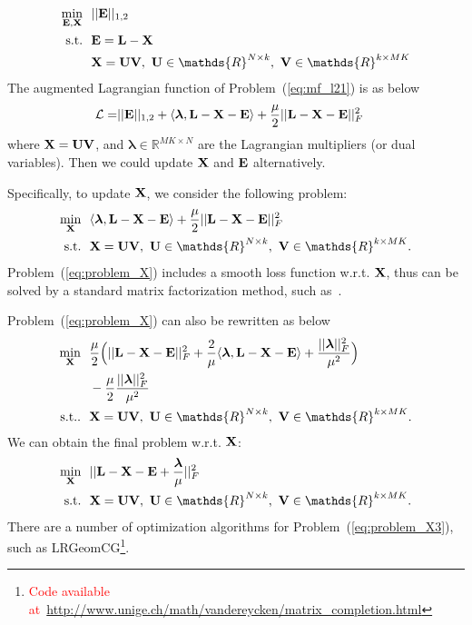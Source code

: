 \documentclass[letterpaper]{article}
\def\bE{{\bf E}}
\def\blambda{{\bm \lambda}}
\def\calL{{\mathcal{L}}}
\def\bL{{\bf L}}
\def\bU{{\bf U}}
\def\bV{{\bf V}}
\def\dsR{\mathds{R}}
\def\bX{{\bf X}}
\def\bX{{\bf X}}
\def\st{{\text{s.t.}}}
\def\yanred{\textcolor{red}}
\begin{document}
\begin{align}\label{eq:mf_l21_constrained}
  \min_{\bE, \bX} ~&~ || \bE ||_{1,2}   \nonumber \\
  \st             ~&~ \bE = \bL - \bX   \nonumber \\
                  ~&~ \bX = \bU \bV,~\bU \in \dsR^{N \times k},~\bV \in \dsR^{k \times MK}
\end{align}
The augmented Lagrangian function of Problem~(\ref{eq:mf_l21}) is as below
\begin{align}\label{eq:lagrangian_l21}
  \calL = & || \bE ||_{1,2} + \langle \blambda, \bL - \bX - \bE \rangle + \frac{\mu}{2} || \bL - \bX - \bE ||_F^2
\end{align}
\noindent
where $\bX = \bU \bV$,
and $\blambda \in \dsR^{MK \times N}$ are the Lagrangian multipliers (or dual variables).
Then we could update $\bX$ and $\bE$ alternatively.


Specifically, to update $\bX$, we consider the following problem:
\begin{align}\label{eq:problem_X}
  \min_{\bX} ~&~ \langle \blambda, \bL - \bX - \bE \rangle + \frac{\mu}{2} || \bL - \bX - \bE ||_F^2  \nonumber  \\
  \st        ~&~ \bX = \bU \bV,~\bU \in \dsR^{N \times k},~\bV \in \dsR^{k \times MK}   .
\end{align}
Problem~(\ref{eq:problem_X}) includes a smooth loss function w.r.t. $\bX$, thus can be solved by a standard matrix factorization method, such as~\cite{yanijcai2015scalable,tanicml2014riemannian,vandereyckensiamjo2013low}.


Problem~(\ref{eq:problem_X}) can also be rewritten as below
\begin{align}\label{eq:problem_X2}
  \min_{\bX} ~&~ \frac{\mu}{2} \Big( || \bL - \bX - \bE ||_F^2 + \frac{2}{\mu} \langle \blambda, \bL - \bX - \bE \rangle + \frac{|| \blambda ||_F^2}{\mu^2} \Big)    \nonumber   \\
             ~&~ - \frac{\mu}{2} \frac{|| \blambda ||_F^2}{\mu^2}   \nonumber \\
  \st.       ~&~ \bX = \bU \bV,~\bU \in \dsR^{N \times k},~\bV \in \dsR^{k \times MK}   .
\end{align}
\noindent
We can obtain the final problem w.r.t. $\bX$:
\begin{align}\label{eq:problem_X3}
  \min_{\bX} ~&~ || \bL - \bX - \bE + \frac{\blambda}{\mu} ||_F^2   \nonumber \\
  \st        ~&~ \bX = \bU \bV,~\bU \in \dsR^{N \times k},~\bV \in \dsR^{k \times MK}   .
\end{align}
\noindent
There are a number of optimization algorithms for Problem~(\ref{eq:problem_X3}), such as LRGeomCG\footnote{\yanred{Code available at~\url{http://www.unige.ch/math/vandereycken/matrix_completion.html}}}.
\end{document}
